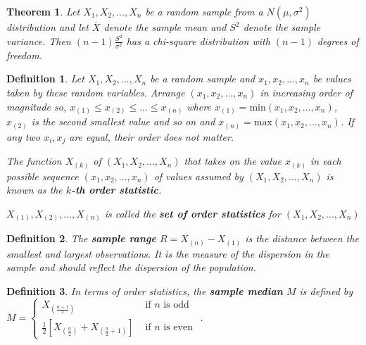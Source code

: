 \documentclass[12pt,twoside]{report}
\theoremstyle{thmstyle}
\newtheorem{defn}{Definition}
\newtheorem{thm}{Theorem}
\begin{document}
\begin{thm}
    Let $X_1, X_2, ... , X_n$ be a random sample from a $N(\mu, \sigma^2)$ distribution and let $\overline{X}$ denote the sample mean and $S^2$ denote the sample variance. Then $(n-1) \frac{S^2}{\sigma^2}$ has a chi-square distribution with $(n-1)$ degrees of freedom.
\end{thm}

\begin{defn}
    Let $X_1, X_2, ..., X_n$ be a random sample and $x_1, x_2, ..., x_n$ be values taken by these random variables.
    Arrange $(x_1, x_2, ..., x_n)$ in increasing order of magnitude so, $x_{(1)} \leq x_{(2)} \leq ... \leq x_{(n)}$
    where $x_{(1)} = \text{min}(x_1, x_2, ..., x_n)$, $x_{(2)}$ is the second smallest value and so on and $x_{(n)} = \text{max}(x_1, x_2, ..., x_n)$. If any two $x_i, x_j$ are equal, their order does not matter.

    
    The function $X_{(k)}$ of $(X_1, X_2, ..., X_n)$ that takes on the value $x_{(k)}$ in each possible sequence $(x_1, x_2, ... , x_n)$ of values assumed by $(X_1, X_2, ..., X_n)$ is known as the \textbf{$k$-th order statistic}. 

    ${X_{(1)}, X_{(2)}, ..., X_{(n)}}$ is called the \textbf{set of order statistics} for $(X_1, X_2, ..., X_n)$
\end{defn}

\begin{defn}
    The \textbf{sample range} $R = X_{(n)} - X_{(1)}$ is the distance between the smallest and largest observations. It is the measure of the dispersion in the sample and should reflect the dispersion of the population.
\end{defn}

\begin{defn}
    In terms of order statistics, the \textbf{sample median} $M$ is defined by \\ 
    $M = \begin{cases} X_{(\frac{n+1}{2})} & \text{ if } n \text{ is odd } \\ \frac{1}{2} \left[ X_{(\frac{n}{2})} + X_{(\frac{n}{2} + 1)}\right] & \text{ if } n \text{ is even } \end{cases}$.
\end{defn}
\end{document}
